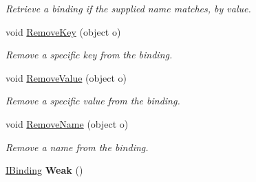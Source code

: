 \begin{DoxyCompactItemize}
\begin{DoxyCompactList}\small\item\em Retrieve a binding if the supplied name matches, by value. \end{DoxyCompactList}\item 
\hypertarget{interfacestrange_1_1framework_1_1api_1_1_i_binding_a45170158a551821a12300ec498107b93}{void \hyperlink{interfacestrange_1_1framework_1_1api_1_1_i_binding_a45170158a551821a12300ec498107b93}{Remove\-Key} (object o)}\label{interfacestrange_1_1framework_1_1api_1_1_i_binding_a45170158a551821a12300ec498107b93}

\begin{DoxyCompactList}\small\item\em Remove a specific key from the binding. \end{DoxyCompactList}\item 
\hypertarget{interfacestrange_1_1framework_1_1api_1_1_i_binding_ae74c9abff54a85859979aae0a0b5770a}{void \hyperlink{interfacestrange_1_1framework_1_1api_1_1_i_binding_ae74c9abff54a85859979aae0a0b5770a}{Remove\-Value} (object o)}\label{interfacestrange_1_1framework_1_1api_1_1_i_binding_ae74c9abff54a85859979aae0a0b5770a}

\begin{DoxyCompactList}\small\item\em Remove a specific value from the binding. \end{DoxyCompactList}\item 
\hypertarget{interfacestrange_1_1framework_1_1api_1_1_i_binding_addc5600176d59f33a7a5553db5ed33b7}{void \hyperlink{interfacestrange_1_1framework_1_1api_1_1_i_binding_addc5600176d59f33a7a5553db5ed33b7}{Remove\-Name} (object o)}\label{interfacestrange_1_1framework_1_1api_1_1_i_binding_addc5600176d59f33a7a5553db5ed33b7}

\begin{DoxyCompactList}\small\item\em Remove a name from the binding. \end{DoxyCompactList}\item 
\hypertarget{interfacestrange_1_1framework_1_1api_1_1_i_binding_a7491e99b7d906b7982cdfcac0c4288be}{\hyperlink{interfacestrange_1_1framework_1_1api_1_1_i_binding}{I\-Binding} {\bfseries Weak} ()}\label{interfacestrange_1_1framework_1_1api_1_1_i_binding_a7491e99b7d906b7982cdfcac0c4288be}

\end{DoxyCompactItemize}
